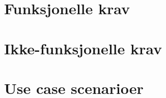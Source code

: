 \section{Funksjonelle krav}

	

\section{Ikke-funksjonelle krav}

	

\section{Use case scenarioer}

	